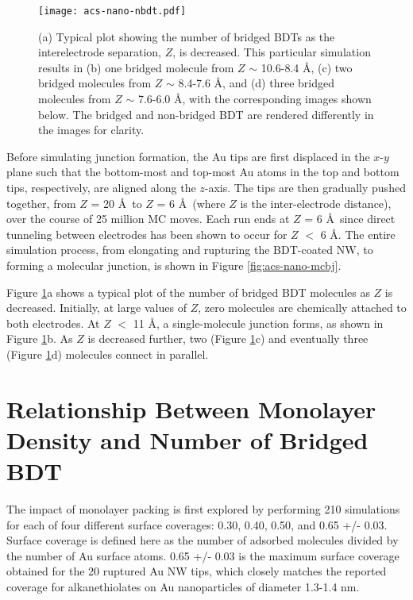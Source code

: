 \documentclass[10pt]{report}  %
\newcommand\findent{\hspace*{\parindent}}
\begin{document}
\begin{figure}[]
	\centering
	\texttt{[image: acs-nano-nbdt.pdf]}
	\caption{(a) Typical plot showing the number of bridged BDTs as the interelectrode separation, $Z$, is decreased. This particular simulation results in (b) one bridged molecule from $Z$ $\sim$ 10.6-8.4 \AA, (c) two bridged molecules from $Z$ $\sim$ 8.4-7.6 \AA, and (d) three bridged molecules from $Z$ $\sim$ 7.6-6.0 \AA, with the corresponding images shown below.  The bridged and non-bridged BDT are rendered differently in the images for clarity.}
	\label{fig:acs-nano-nbdt}
\end{figure}

Before simulating junction formation, the Au tips are first displaced in the $x$-$y$ plane such that the bottom-most and top-most Au atoms in the top and bottom tips, respectively, are aligned along the $z$-axis. The tips are then gradually pushed together, from $Z$ = 20 \AA\ to $Z$ = 6 \AA\ (where $Z$ is the inter-electrode distance), over the course of 25 million MC moves.  Each run ends at $Z$ = 6 \AA\ since direct tunneling between electrodes has been shown to occur for $Z$ $<$ 6 \AA. \cite{Sergueev:2010,Pontes:2011} The entire simulation process, from elongating and rupturing the BDT-coated NW, to forming a molecular junction, is shown in Figure \ref{fig:acs-nano-mcbj}.

Figure \ref{fig:acs-nano-nbdt}a shows a typical plot of the number of bridged BDT molecules as $Z$ is decreased.  Initially, at large values of $Z$, zero molecules are chemically attached to both electrodes.  At $Z$ $<$ 11 \AA, a single-molecule junction forms, as shown in Figure \ref{fig:acs-nano-nbdt}b.  As $Z$ is decreased further, two (Figure \ref{fig:acs-nano-nbdt}c) and eventually three (Figure \ref{fig:acs-nano-nbdt}d) molecules connect in parallel.

\section{Relationship Between Monolayer Density and Number of Bridged BDT}

\findent The impact of monolayer packing is first explored by performing 210 simulations for each of four different surface coverages: 0.30, 0.40, 0.50, and 0.65 +/- 0.03.  Surface coverage is defined here as the number of adsorbed molecules divided by the number of Au surface atoms.  0.65 +/- 0.03 is the maximum surface coverage obtained for the 20 ruptured Au NW tips, which closely matches the reported coverage for alkanethiolates on Au nanoparticles of diameter 1.3-1.4 nm.\cite{Hostetler:1998}  
\end{document}
